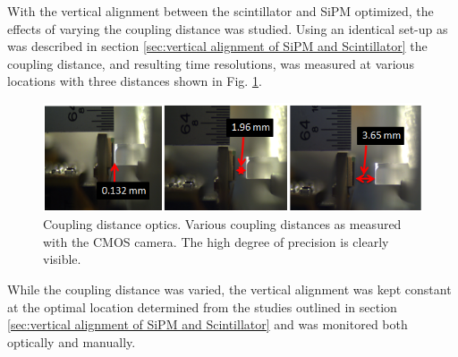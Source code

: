 With the vertical alignment between the scintillator and SiPM optimized, the effects of varying the coupling distance was studied.  Using an identical set-up as was described in section \ref{sec:vertical alignment of SiPM and Scintillator} the coupling distance, and resulting time resolutions, was measured at various locations with three distances shown in Fig. \ref{fig:sipm_coupling_optics}.  
\begin{figure}[!htb]
	\centering
	\includegraphics[width=1.0\columnwidth]{misalignment/figs/sipm_coupling_optics}
	\caption{Coupling distance optics. Various coupling distances as measured with the CMOS camera.  The high degree of precision is clearly visible.}
	\label{fig:sipm_coupling_optics}
\end{figure}
While the coupling distance was varied, the vertical alignment was kept constant at the optimal location determined from the studies outlined in section \ref{sec:vertical alignment of SiPM and Scintillator} and was monitored both optically and manually.

